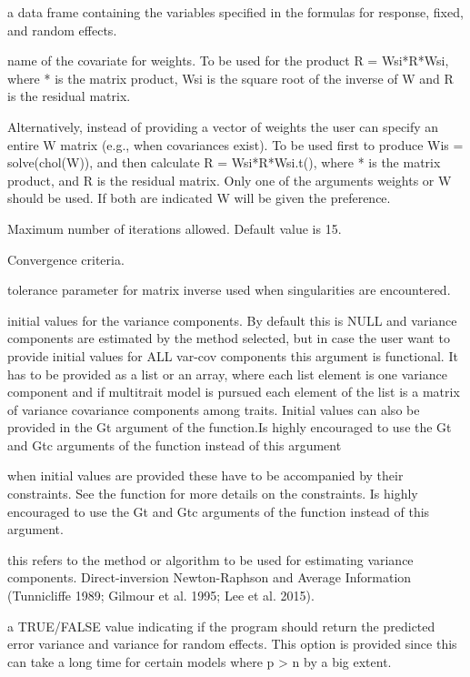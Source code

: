 \documentclass[a4paper]{book}
\begin{document}
\begin{Arguments}
\begin{ldescription}
\item[\code{data}] a data frame containing the variables specified in the formulas for response, fixed, and random effects.
\item[\code{weights}] name of the covariate for weights. To be used for the product R = Wsi*R*Wsi, where * is the matrix product, Wsi is the square root of the inverse of W and R is the residual matrix.
\item[\code{W}] Alternatively, instead of providing a vector of weights the user can specify an entire W matrix (e.g., when covariances exist). To be used first to produce Wis = solve(chol(W)), and then calculate R = Wsi*R*Wsi.t(), where * is the matrix product, and R is the residual matrix. Only one of the arguments weights or W should be used. If both are indicated W will be given the preference.
\item[\code{nIters}] Maximum number of iterations allowed.  Default value is 15.
\item[\code{tolParConvLL}] Convergence criteria.
\item[\code{tolParInv}] tolerance parameter for matrix inverse used when singularities are encountered.
\item[\code{init}] initial values for the variance components. By default this is NULL and variance components are estimated by the method selected, but in case the user want to provide initial values for ALL var-cov components this argument is functional. It has to be provided as a list or an array, where each list element is one variance component and if multitrait model is pursued each element of the list is a matrix of variance covariance components among traits. Initial values can also be provided in the Gt argument of the  function.Is highly encouraged to use the Gt and Gtc arguments of the  function instead of this argument
\item[\code{constraints}] when initial values are provided these have to be accompanied by their constraints. See the  function for more details on the constraints. Is highly encouraged to use the Gt and Gtc arguments of the  function instead of this argument.
\item[\code{method}] this refers to the method or algorithm to be used for estimating variance components. Direct-inversion Newton-Raphson  and Average Information  (Tunnicliffe 1989; Gilmour et al. 1995; Lee et al. 2015).
\item[\code{getPEV}] a TRUE/FALSE value indicating if the program should return the predicted error variance and variance for random effects. This option is provided since this can take a long time for certain models where p > n by a big extent.

\end{ldescription}
\end{Arguments}
\end{document}
